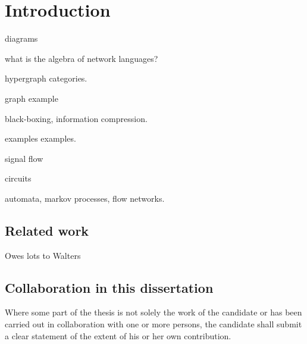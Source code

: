 {}
\chapter*{Introduction}

diagrams

what is the algebra of network languages?

hypergraph categories.

graph example

black-boxing, information compression.

examples examples.

signal flow

circuits

automata, markov processes, flow networks.

\section{Related work}
Owes lots to Walters

\section{Collaboration in this dissertation}
Where some part of the thesis is not solely the work of the candidate or has been carried out in collaboration with one or more persons, the candidate shall submit a clear statement of the extent of his or her own contribution.
